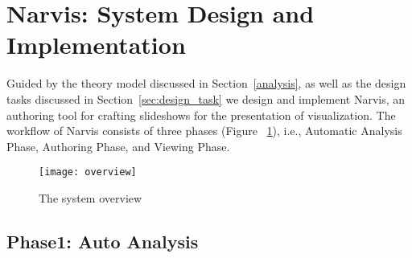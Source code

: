 \section{Narvis: System Design and Implementation}


Guided by the theory model discussed in Section~\ref{analysis}, as well as the design tasks discussed in Section~\ref{sec:design_task} we design and implement Narvis, an authoring tool for crafting slideshows for the presentation of visualization. The workflow of Narvis consists of three phases (Figure ~\ref{fig:overview}), i.e., Automatic Analysis Phase, Authoring Phase, and Viewing Phase.


\begin{figure}
 \centering %
 \texttt{[image: overview]}
 \caption{The system overview}
 \label{fig:overview}
\end{figure}


\subsection{Phase1: Auto Analysis}


